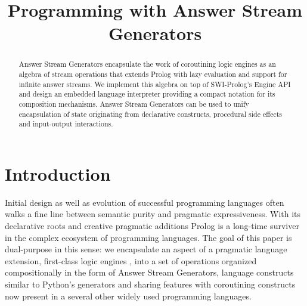 \documentclass{new_tlp}
\begin{document}
\title[Answer Stream Generators]
{%
Programming with Answer Stream Generators}

\begin{comment}
 \author[Paul Tarau]
         {%
          Paul Tarau\\
          Dept. of Computer Science and Engineering \\ University of North Texas\\
          1155 Union Circle, Denton, Texas 76203, USA}
\end{comment}

\maketitle

\begin{abstract}
Answer Stream Generators encapsulate the work of coroutining logic engines as an algebra of stream operations that extends Prolog with lazy evaluation and  support for infinite answer streams. We implement this algebra on top of SWI-Prolog's Engine API and design an embedded language interpreter providing a compact notation for its composition mechanisms.
Answer Stream Generators can be used to unify encapsulation of state originating from declarative constructs, procedural side effects and input-output interactions. 


\end{abstract}

\section{Introduction}

Initial design as well as evolution of successful programming languages often walks a fine line between semantic purity and pragmatic expressiveness. With its declarative roots and creative pragmatic additions Prolog is a long-time surviver in the complex ecosystem of programming languages. The goal of this paper is dual-purpose in this sense: we encapsulate an aspect of a pragmatic language extension,
first-class logic engines \cite{tarau:parimp99,tarau:cl2000,iclp08:inter,ciclops08:pINTER,bp2011},
into a set of operations organized compositionally in the form of Answer Stream Generators, language constructs similar to Python's generators and sharing features with coroutining constructs now present in a several other widely used programming languages.
\end{document}

